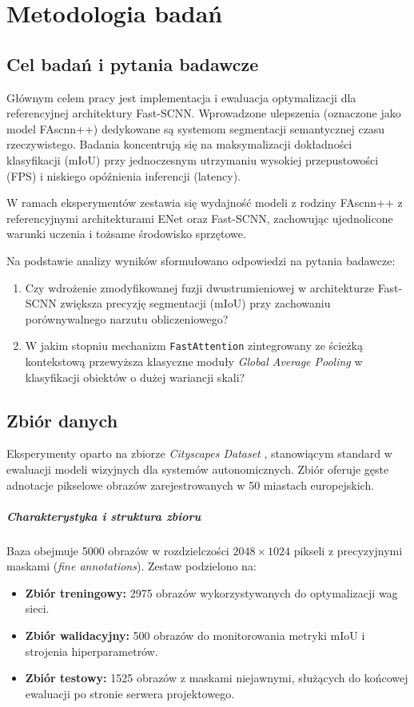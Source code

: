\chapter{Metodologia badań}

\section{Cel badań i pytania badawcze}
Głównym celem pracy jest implementacja i ewaluacja optymalizacji dla referencyjnej architektury Fast-SCNN. Wprowadzone ulepszenia (oznaczone jako model FAscnn++) dedykowane są systemom segmentacji semantycznej czasu rzeczywistego. Badania koncentrują się na maksymalizacji dokładności klasyfikacji (mIoU) przy jednoczesnym utrzymaniu wysokiej przepustowości (FPS) i niskiego opóźnienia inferencji (latency).

W ramach eksperymentów zestawia się wydajność modeli z rodziny FAscnn++ z referencyjnymi architekturami ENet oraz Fast-SCNN, zachowując ujednolicone warunki uczenia i tożsame środowisko sprzętowe.

Na podstawie analizy wyników sformułowano odpowiedzi na pytania badawcze:
\begin{enumerate}
    \item Czy wdrożenie zmodyfikowanej fuzji dwustrumieniowej w architekturze Fast-SCNN zwiększa precyzję segmentacji (mIoU) przy zachowaniu porównywalnego narzutu obliczeniowego?
    \item W jakim stopniu mechanizm \texttt{FastAttention} zintegrowany ze ścieżką kontekstową przewyższa klasyczne moduły \textit{Global Average Pooling} w klasyfikacji obiektów o dużej wariancji skali?
\end{enumerate}

\section{Zbiór danych}
Eksperymenty oparto na zbiorze \textit{Cityscapes Dataset} , stanowiącym standard w ewaluacji modeli wizyjnych dla systemów autonomicznych. Zbiór oferuje gęste adnotacje pikselowe obrazów zarejestrowanych w 50 miastach europejskich.

\paragraph{Charakterystyka i struktura zbioru}
Baza obejmuje 5000 obrazów w rozdzielczości $2048 \times 1024$ pikseli z precyzyjnymi maskami (\textit{fine annotations}). Zestaw podzielono na:
\begin{itemize}
    \item \textbf{Zbiór treningowy:} 2975 obrazów wykorzystywanych do optymalizacji wag sieci.
    \item \textbf{Zbiór walidacyjny:} 500 obrazów do monitorowania metryki mIoU i strojenia hiperparametrów.
    \item \textbf{Zbiór testowy:} 1525 obrazów z maskami niejawnymi, służących do końcowej ewaluacji po stronie serwera projektowego.
\end{itemize}


